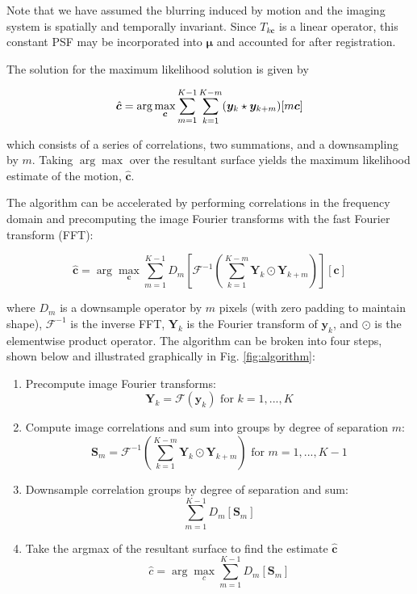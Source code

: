 \documentclass{article}
\newcommand\lstar{\mkern4mu{\star}\mkern4mu}
\begin{document}
Note that we have assumed the blurring induced by motion and the imaging system is spatially and temporally invariant.  Since $T_{k\bm{c}}$ is a linear operator, this constant PSF may be incorporated into $\bm{\mu}$ and accounted for after registration.

The solution for the maximum likelihood solution is given by

\begin{equation}
\hat{\bm{c}} = \arg \max_{\bm{c}} \sum_{m=1}^{K-1}\sum_{k=1}^{K-m} (\bm{y}_k \lstar \bm{y}_{k+m})[m\bm{c}]
\label{eq:algorithm_orig}
\end{equation}

which consists of a series of correlations, two summations, and a downsampling by $m$.  Taking $\arg \max$ over the resultant surface yields the maximum likelihood estimate of the motion, $\hat{\bm{c}}$.

The algorithm can be accelerated by performing correlations in the frequency domain and precomputing the image Fourier transforms with the fast Fourier transform (FFT):

\begin{equation}
\hat{\bm{c}} = \arg \max_{\bm{c}} \sum_{m=1}^{K-1} D_m \left[
\mathcal{F}^{-1} \left( \sum_{k=1}^{K-m} \bm{Y}_k \odot \bm{Y}_{k+m} \right)
\right][\bm{c}]
\label{eq:algorithm}
\end{equation}

where $D_m$ is a downsample operator by $m$ pixels (with zero padding to maintain shape), $\mathcal{F}^{-1}$ is the inverse FFT, $\bm{Y}_k$ is the Fourier transform of $\bm{y}_k$, and $\odot$ is the elementwise product operator.
The algorithm can be broken into four steps, shown below and illustrated graphically in Fig. \ref{fig:algorithm}:

\begin{enumerate}
  \item Precompute image Fourier transforms:
    $$\bm{Y}_k=\mathcal{F}(\bm{y}_k) \text{ for } k=1,...,K$$
  \item Compute image correlations and sum into groups by degree of separation $m$:
    $$\bm{S}_m = \mathcal{F}^{-1} \left( \sum_{k=1}^{K-m} \bm{Y}_k \odot \bm{Y}_{k+m} \right) \text{ for } m=1, ..., K-1$$
  \item Downsample correlation groups by degree of separation and sum:
    $$\sum_{m=1}^{K-1} D_m \left[ \bm{S}_m \right]$$
  \item Take the argmax of the resultant surface to find the estimate $\hat{\bm{c}}$
    $$\hat{c} = \arg \max_c \sum_{m=1}^{K-1} D_m \left[ \bm{S}_m \right]$$
\end{enumerate}
\end{document}
